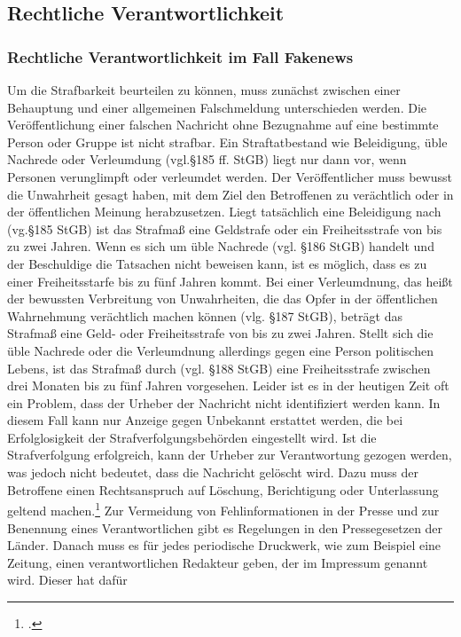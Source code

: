 \documentclass[Thesis.tex]{subfiles}
\begin{document}
\subsection{Rechtliche Verantwortlichkeit}
\subsubsection{Rechtliche Verantwortlichkeit im Fall Fakenews}
Um die Strafbarkeit beurteilen zu können, muss zunächst zwischen einer Behauptung
 und einer allgemeinen Falschmeldung unterschieden werden. Die Veröffentlichung
einer falschen Nachricht ohne Bezugnahme auf eine bestimmte Person oder Gruppe
ist nicht strafbar. Ein Straftatbestand wie Beleidigung, üble Nachrede oder
Verleumdung (vgl.\S 185 ff. StGB)
liegt nur dann vor, wenn Personen verunglimpft oder verleumdet
werden. Der Veröffentlicher muss bewusst die Unwahrheit gesagt haben,
mit dem  Ziel den Betroffenen zu verächtlich oder in der öffentlichen
Meinung herabzusetzen.
Liegt tatsächlich eine Beleidigung nach (vg.\S 185 StGB) ist das Strafmaß eine Geldstrafe
oder ein Freiheitsstrafe von bis zu zwei Jahren. Wenn es sich um üble Nachrede (vgl. \S 186 StGB)
handelt und der Beschuldige die Tatsachen nicht beweisen kann, ist es möglich, dass es zu einer
Freiheitsstarfe bis zu fünf Jahren kommt. Bei einer Verleumdnung, das heißt der bewussten Verbreitung von Unwahrheiten,
die das Opfer in der öffentlichen Wahrnehmung verächtlich machen können (vlg. \S 187 StGB), beträgt das Strafmaß eine Geld-
oder Freiheitsstrafe von bis zu zwei Jahren. Stellt sich die üble Nachrede oder die Verleumdnung allerdings gegen eine Person
politischen Lebens, ist das Strafmaß durch (vgl. \S 188 StGB) eine Freiheitsstrafe zwischen drei Monaten bis zu fünf Jahren vorgesehen.
Leider ist es in der heutigen Zeit oft ein Problem, dass der Urheber der Nachricht nicht 
identifiziert werden kann. In diesem Fall kann nur Anzeige gegen Unbekannt 
erstattet werden, die bei Erfolglosigkeit der Strafverfolgungsbehörden eingestellt 
wird.
Ist die Strafverfolgung erfolgreich, kann der Urheber zur Verantwortung gezogen werden, was jedoch nicht bedeutet,
dass die Nachricht gelöscht wird. Dazu muss der Betroffene einen Rechtsanspruch auf Löschung,
Berichtigung oder Unterlassung geltend machen.\footcite{DBWDUmgangmitFakenews} %
Zur Vermeidung von Fehlinformationen in der Presse und zur Benennung eines
Verantwortlichen gibt es Regelungen in den Pressegesetzen der Länder.
Danach muss es für jedes periodische Druckwerk, wie zum Beispiel eine Zeitung,
einen verantwortlichen Redakteur geben, der im Impressum genannt wird. Dieser hat dafür
\end{document}
